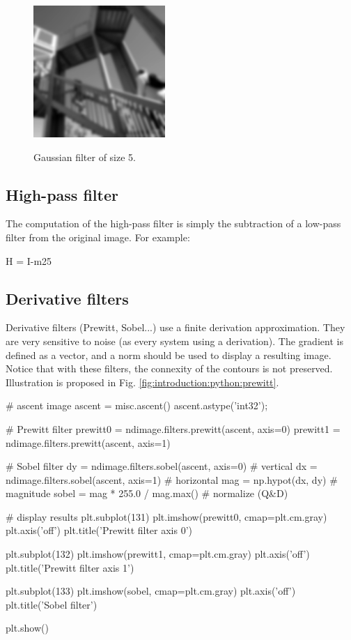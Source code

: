 \vspace*{-4pt}

\begin{figure}[H]
 \centering\caption{Gaussian filter of size 5.}%
 \includegraphics[width=5cm]{gaussian.png}%
 \label{fig:introduction:python:gaussian}%
\end{figure}

\subsection{High-pass filter}
The computation of the high-pass filter is simply the subtraction of a low-pass filter from the original image. For example:

\begin{python}
H = I-m25
\end{python}


\vspace*{-7pt}
\subsection{Derivative filters}
Derivative filters (Prewitt, Sobel...) use a finite derivation approximation. They are very sensitive to noise (as every system using a derivation). The gradient is defined as a vector, and a norm should be used to display a resulting image. Notice that with these filters, the connexity of the contours is not preserved.
Illustration is proposed in Fig. \ref{fig:introduction:python:prewitt}.

\begin{python}
# ascent image
ascent = misc.ascent()
ascent.astype('int32');

# Prewitt filter
prewitt0 = ndimage.filters.prewitt(ascent, axis=0)
prewitt1 = ndimage.filters.prewitt(ascent, axis=1)

# Sobel filter
dy = ndimage.filters.sobel(ascent, axis=0) # vertical
dx = ndimage.filters.sobel(ascent, axis=1) # horizontal
mag = np.hypot(dx, dy)  # magnitude
sobel = mag * 255.0 / mag.max()  # normalize (Q&D)

# display results
plt.subplot(131)
plt.imshow(prewitt0, cmap=plt.cm.gray)
plt.axis('off')
plt.title('Prewitt filter axis 0')

plt.subplot(132)
plt.imshow(prewitt1, cmap=plt.cm.gray)
plt.axis('off')
plt.title('Prewitt filter axis 1')

plt.subplot(133)
plt.imshow(sobel, cmap=plt.cm.gray)
plt.axis('off')
plt.title('Sobel filter')

plt.show()
\end{python}

